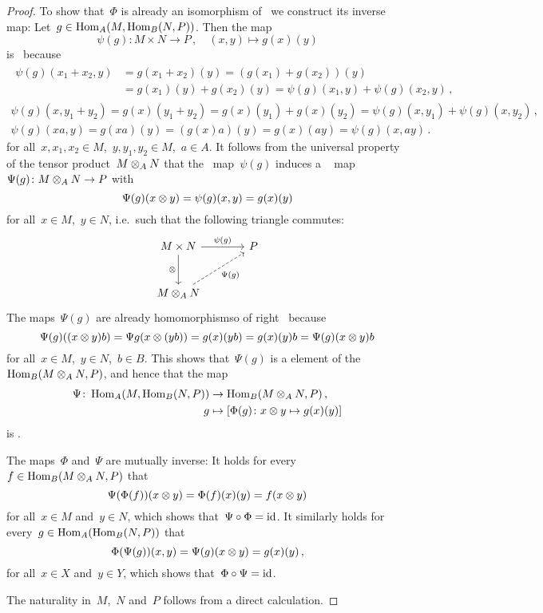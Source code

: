 \begin{proof}
  To show that~$\Phi$ is already an isomorphism of~{\modules{$\kf$}} we construct its inverse map:
  Let~$g \in \operatorname{Hom}_A(M, \operatorname{Hom}_B(N,P))$.
  Then the map
  \[
            \psi(g)
    \colon  M \times N
    \to     P \,,
    \quad   (x,y)
    \mapsto g(x)(y)
  \]
  is~{} because
  \begin{gather*}
    \begin{aligned}
          \psi(g)(x_1 + x_2, y)
      &=  g(x_1 + x_2)(y)
       =  (g(x_1) + g(x_2))(y)  \\
      &=  g(x_1)(y) + g(x_2)(y)
       =  \psi(g)(x_1,y) + \psi(g)(x_2,y) \,,
    \end{aligned}
  \\
      \psi(g)(x, y_1 + y_2)
    = g(x)(y_1 + y_2)
    = g(x)(y_1) + g(x)(y_2)
    = \psi(g)(x, y_1) + \psi(g)(x, y_2) \,,
  \\
      \psi(g)(xa, y)
    = g(xa)(y)
    = (g(x)a)(y)
    = g(x)(ay)
    = \psi(g)(x,ay) \,.
  \end{gather*}
  for all~$x, x_1, x_2 \in M$,~$y, y_1, y_2 \in M$,~$a \in A$.
  It follows from the universal property of the tensor product~$M \otimes_A N$ that the~{} map~$\psi(g)$ induces a {\welldef}~{\klin} map~$\Psi(g) \colon M \otimes_A N \to P$ with
  \[
      \Psi(g)(x \otimes y)
    = \psi(g)(x, y)
    = g(x)(y)
  \]
  for all~$x \in M$,~$y \in N$, i.e.\ such that the following triangle commutes:
  \[
    \begin{tikzcd}[sep = large]
        M \times N
        \arrow{r}[above]{\psi(g)}
        \arrow{d}[left]{\tensor}
      & P
      \\
        M \tensor_A N
        \arrow[dashed]{ur}[below right]{\Psi(g)}
      & {}
    \end{tikzcd}
  \]
  The maps~$\Psi(g)$ are already homomorphismso of right~{} because
  \[
      \Psi(g)((x \otimes y) b)
    = \Psi{g}(x \otimes (yb))
    = g(x)(yb)
    = g(x)(y) b
    = \Psi(g)(x \otimes y) b
  \]
  for all~$x \in M$,~$y \in N$,~$b \in B$.
  This shows that~$\Psi(g)$ is a {\welldef} element of the~{\module{$\kf$}}~$\operatorname{Hom}_B(M \otimes_A N, P)$, and hence that the map
  \begin{align*}
              \Psi
     \colon   \operatorname{Hom}_A(M, \operatorname{Hom}_B(N,P))
    &\to      \operatorname{Hom}_B(M \otimes_A N, P) \,, \\
              g
    &\mapsto  \left[
                        \Phi(g)
                \colon  x \otimes y
                \mapsto g(x)(y)
              \right]
  \end{align*}
  is {\welldef}.
  
  The maps~$\Phi$ and~$\Psi$ are mutually inverse:
  It holds for every~$f \in \operatorname{Hom}_B(M \otimes_A N, P)$ that
  \[
      \Psi(\Phi(f))(x \otimes y)
    = \Phi(f)(x)(y)
    = f(x \otimes y)
  \]
  for all~$x \in M$ and~$y \in N$, which shows that~$\Psi \circ \Phi = \operatorname{id}$.
  It similarly holds for every~$g \in \operatorname{Hom}_A(\operatorname{Hom}_B(N, P))$ that
  \[
      \Phi(\Psi(g))(x,y)
    = \Psi(g)(x \otimes y)
    = g(x)(y) \,,
  \]
  for all~$x \in X$ and~$y \in Y$, which shows that~$\Phi \circ \Psi = \operatorname{id}$.
  
  The naturality in~$M$,~$N$ and~$P$ follows from a direct calculation.
\end{proof}




